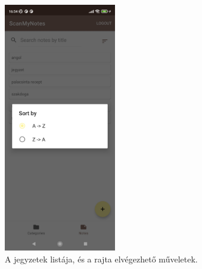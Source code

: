 \begin{figure}[!ht]
	\includegraphics[width=49mm, keepaspectratio]{figures/notelist_sort.jpg}
	\caption{A jegyzetek listája, és a rajta elvégezhető műveletek.}
	\label{fig:NoteListScreen2}
\end{figure}

